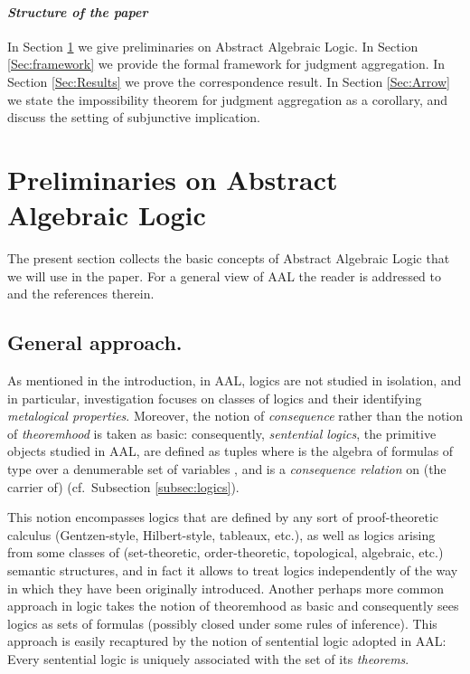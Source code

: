 \documentclass{llncs}
\numberwithin{equation}{section}
\begin{document}
\paragraph{\bf\em Structure of the paper} In Section \ref{sec:preliminaries} we give preliminaries on Abstract Algebraic Logic. In Section \ref{Sec:framework} we provide the formal framework for judgment aggregation. In Section \ref{Sec:Results} we prove the correspondence result. In Section \ref{Sec:Arrow} we state the impossibility theorem for judgment aggregation as a corollary, and discuss the setting of subjunctive implication.

\section{Preliminaries on Abstract Algebraic Logic}
\label{sec:preliminaries}
The present section collects the basic concepts of Abstract Algebraic Logic that we will use in the paper.
For a general view of AAL the reader is addressed to \cite{FoJa96} and the references therein.

\subsection{General approach.} As mentioned in the introduction, in AAL,  logics are not studied in isolation, and in particular,  investigation focuses on classes of logics and their identifying {\em metalogical properties}.  Moreover, the notion of {\em consequence} rather than the notion of {\em theoremhood} is taken as basic: consequently, {\em sentential logics}, the primitive objects studied in AAL, are defined as tuples  where  is the algebra of formulas of type  over a denumerable set of variables , and  is a {\em consequence relation } on (the carrier of)  (cf.\ Subsection \ref{subsec:logics}).

\noindent This notion encompasses logics that are defined by any sort of proof-theoretic calculus (Gentzen-style, Hilbert-style, tableaux, etc.), as well as logics arising from some classes of (set-theoretic, order-theoretic, topological, algebraic, etc.) semantic structures, and in fact it allows to treat logics independently of the way in which they have been originally introduced. Another perhaps more common approach in logic takes the notion of theoremhood as basic and consequently sees logics as sets of formulas (possibly closed under some rules of inference). This approach is easily recaptured by the notion of sentential logic adopted in AAL: Every sentential logic  is uniquely associated with the set   of its {\em theorems}.
\end{document}

